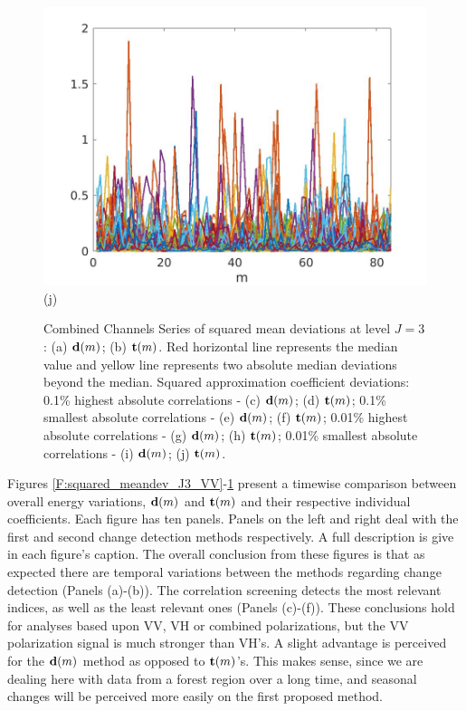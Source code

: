 \documentclass[journal]{IEEEtran}
\newcommand{\vd}{{\textbf d}}
\newcommand{\vt}{{\textbf t}}
\begin{document}
\begin{figure}[htp!]
\includegraphics[scale=.12]{../../figs/perc01_consecdif_J3_euclid_sqrdif_lowest_cor_locations}(j)
\caption{{\sc Combined Channels} Series of squared mean deviations at level $J=3$: (a) $\vd(m)$; (b) $\vt(m)$. Red horizontal line represents the median value and yellow line represents two absolute median deviations beyond the median. Squared approximation coefficient deviations: 0.1\% highest absolute correlations - (c) $\vd(m)$;  (d) $\vt(m)$; 0.1\% smallest absolute correlations - (e) $\vd(m)$; (f) $\vt(m)$; 0.01\% highest absolute correlations - (g) $\vd(m)$;  (h) $\vt(m)$;  0.01\% smallest absolute correlations - (i) $\vd(m)$; (j)  $\vt(m)$. 
} 
\label{F:squared_meandev_J3_euclid}
\end{figure}

Figures \ref{F:squared_meandev_J3_VV}-\ref{F:squared_meandev_J3_euclid} present a timewise comparison between overall energy variations, $\vd(m)$ and $\vt(m)$ and their respective individual coefficients. Each figure has ten panels. Panels on the left and right deal with the first and second change detection methods respectively. A full description is give in each figure's caption. The overall conclusion from these figures is that as expected there are temporal variations between the methods regarding change detection (Panels (a)-(b)). The correlation screening detects the most relevant indices, as well as the least relevant ones  (Panels (c)-(f)). 
These conclusions hold for analyses based upon VV, VH or combined polarizations, but the VV polarization signal is much stronger than VH's. A slight advantage is perceived for the $\vd(m)$ method as opposed to $\vt(m)$'s. This makes sense, since we are dealing here with data from a forest region over a long time, and seasonal changes will be perceived more easily on the first proposed method.
\end{document}
